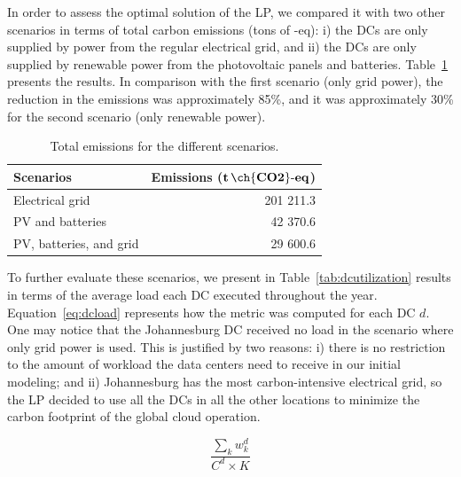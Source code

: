 In order to assess the optimal solution of the LP, we compared it with two other scenarios in terms of total carbon emissions (tons of -eq): i) the DCs are only supplied by power from the regular electrical grid, and ii) the DCs are only supplied by renewable power from the photovoltaic panels and batteries. Table~\ref{tab:emissions} presents the results. In comparison with the first scenario (only grid power), the reduction in the  emissions was approximately 85\%, and it was approximately 30\% for the second scenario (only renewable power).


\begin{table}[h]
\caption{Total emissions for the different scenarios.}\label{tab:emissions} \centering
\begin{tabular}{|p{5cm}|r|}
  \hline
  \textbf{Scenarios} & \textbf{Emissions ($\mathbf{t\,\ch{CO2}\text{-}eq}$)}   \\
  \hline
  Electrical grid                    & 201 211.3    \\
  \hline
  PV and batteries  &                  42 370.6 \\ 
  \hline
  PV, batteries, and grid            &  29 600.6   \\
  \hline


\end{tabular}
\end{table}

To further evaluate these scenarios, we present in Table~\ref{tab:dcutilization} results in terms of the average load each DC executed throughout the year. Equation~\eqref{eq:dcload} represents how the metric was computed for each DC $d$. One may notice that the Johannesburg DC received no load in the scenario where only grid power is used. This is justified by two reasons: i) there is no restriction to the amount of workload the data centers need to receive in our initial modeling; and ii) Johannesburg has the most carbon-intensive electrical grid, so the LP decided to use all the DCs in all the other locations to minimize the carbon footprint of the global cloud operation.

\begin{equation}\label{eq:dcload}
\frac{\sum_k w^d_k} {C^d \times K }
\end{equation}


